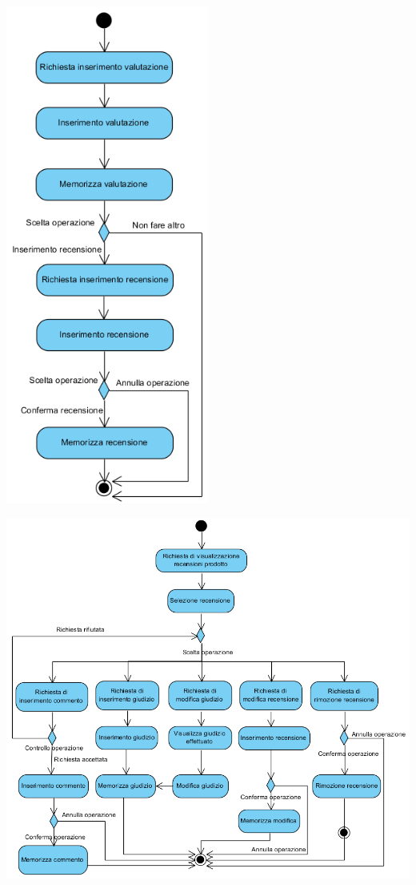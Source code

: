 \begin{center}
	\includegraphics[width=0.5\textwidth]{assets/visualParadigm/attivita/valutazioneRecensione}
\end{center}

\begin{center}
	\includegraphics[width=\textwidth]{assets/visualParadigm/attivita/mostraRecensioni}
\end{center}


